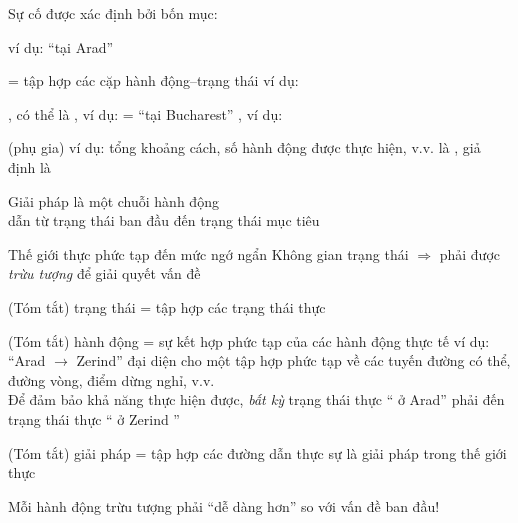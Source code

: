 \documentclass{article}
\begin{document}
\begin{huge}

Sự cố  được xác định bởi bốn mục:

 \quad ví dụ: ``tại Arad''

  = tập hợp các cặp hành động--trạng thái \nl
ví dụ: 

, có thể là\nl
{}, ví dụ:  = ``tại Bucharest''\nl
{}, ví dụ: 

 (phụ gia)\nl
ví dụ: tổng khoảng cách, số hành động được thực hiện, v.v.\nl
{} là , giả định là 

Giải pháp  là một chuỗi hành động\\
dẫn từ trạng thái ban đầu đến trạng thái mục tiêu


Thế giới thực phức tạp đến mức ngớ ngẩn \nl
Không gian trạng thái $\Rightarrow$ phải được \emph{trừu tượng} để giải quyết vấn đề

(Tóm tắt) trạng thái = tập hợp các trạng thái thực

(Tóm tắt) hành động = sự kết hợp phức tạp của các hành động thực tế\nl
   ví dụ: ``Arad $\rightarrow$ Zerind'' đại diện cho một tập hợp phức tạp\nnl
   về các tuyến đường có thể, đường vòng, điểm dừng nghỉ, v.v. \\
Để đảm bảo khả năng thực hiện được, \emph{bất kỳ} trạng thái thực `` ở Arad''\al
phải đến  trạng thái thực `` ở Zerind ''

(Tóm tắt) giải pháp = \nl
   tập hợp các đường dẫn thực sự là giải pháp trong thế giới thực

Mỗi hành động trừu tượng phải ``dễ dàng hơn'' so với vấn đề ban đầu!




\textwidth
{}

\\
\\
\\



\end{huge}
\end{document}
